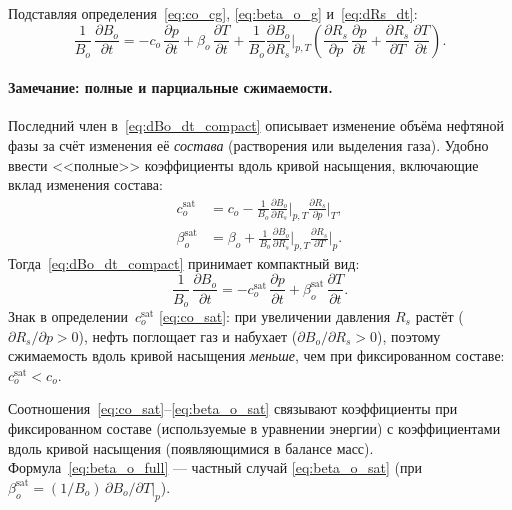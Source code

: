 \documentclass[12pt,a4paper]{article}
\begin{document}
Подставляя определения~\eqref{eq:co_cg}, \eqref{eq:beta_o_g}
и~\eqref{eq:dRs_dt}:
\begin{equation}\label{eq:dBo_dt_compact}
  \frac{1}{B_o}\,\frac{\partial B_o}{\partial t}
  = -c_o\,\frac{\partial p}{\partial t}
    + \beta_o\,\frac{\partial T}{\partial t}
    + \frac{1}{B_o}\frac{\partial B_o}{\partial R_s}\bigg|_{p,T}
      \!\left(
        \frac{\partial R_s}{\partial p}\,\frac{\partial p}{\partial t}
        + \frac{\partial R_s}{\partial T}\,\frac{\partial T}{\partial t}
      \right).
\end{equation}

\paragraph{Замечание: полные и парциальные сжимаемости.}
Последний член в~\eqref{eq:dBo_dt_compact} описывает изменение объёма
нефтяной фазы за счёт изменения её \emph{состава} (растворения или
выделения газа). Удобно ввести <<полные>> коэффициенты вдоль кривой
насыщения, включающие вклад изменения состава:
\begin{align}
  c_o^{\mathrm{sat}} &= c_o
    - \frac{1}{B_o}\frac{\partial B_o}{\partial R_s}\bigg|_{p,T}
      \frac{\partial R_s}{\partial p}\bigg|_T, \label{eq:co_sat} \\
  \beta_o^{\mathrm{sat}} &= \beta_o
    + \frac{1}{B_o}\frac{\partial B_o}{\partial R_s}\bigg|_{p,T}
      \frac{\partial R_s}{\partial T}\bigg|_p. \label{eq:beta_o_sat}
\end{align}
Тогда~\eqref{eq:dBo_dt_compact} принимает компактный вид:
\begin{equation}\label{eq:dBo_dt_sat}
  \frac{1}{B_o}\,\frac{\partial B_o}{\partial t}
  = -c_o^{\mathrm{sat}}\,\frac{\partial p}{\partial t}
    + \beta_o^{\mathrm{sat}}\,\frac{\partial T}{\partial t}.
\end{equation}
Знак в определении~$c_o^{\mathrm{sat}}$ \eqref{eq:co_sat}: при увеличении
давления $R_s$ растёт ($\partial R_s/\partial p > 0$), нефть
поглощает газ и набухает ($\partial B_o/\partial R_s > 0$), поэтому
сжимаемость вдоль кривой насыщения \emph{меньше}, чем при фиксированном
составе: $c_o^{\mathrm{sat}} < c_o$.

Соотношения~\eqref{eq:co_sat}--\eqref{eq:beta_o_sat} связывают
коэффициенты при фиксированном составе (используемые в уравнении
энергии) с коэффициентами вдоль кривой насыщения (появляющимися
в балансе масс). Формула~\eqref{eq:beta_o_full} --- частный случай
\eqref{eq:beta_o_sat} (при $\beta_o^{\mathrm{sat}} = (1/B_o)\,\partial B_o/\partial T|_p$).
\end{document}

